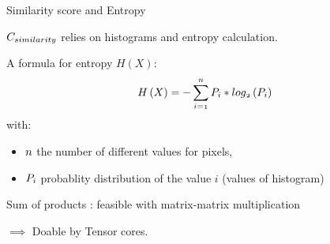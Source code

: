 \begin{frame}{Similarity score and Entropy}
	
	
		
	
	$\mathnormal{C_{similarity}}$ relies on histograms and entropy calculation. 
	
	A formula for entropy $H(X)$:
	\begin{equation}
		\mathnormal{H\left(X\right)=-\sum _{i=1}^{n}{P}_{i} * log_{2}\left({P}_{i}\right)}
	\end{equation}
	with:
	\begin{itemize}
		\item $\mathnormal{n}$ the number of different values for pixels,
		\item $\mathnormal{P_{i}}$ probablity distribution of the value $i$ (values of histogram)
	\end{itemize}
	
	Sum of products : feasible with matrix-matrix multiplication
	
	$\implies$ Doable by Tensor cores.
	

\end{frame}